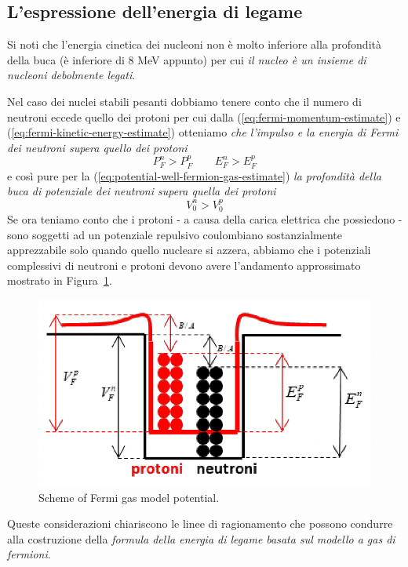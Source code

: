 \subsection{L'espressione dell'energia di legame}\label{subsec:energia-di-legame-fermions-gas}

Si noti che l’energia cinetica dei nucleoni non è molto inferiore alla profondità della buca (è inferiore di 8 MeV appunto) per cui \emph{il nucleo è un insieme di nucleoni debolmente legati}.

Nel caso dei nuclei stabili pesanti dobbiamo tenere conto che il numero di neutroni eccede quello dei protoni per cui dalla (\ref{eq:fermi-momentum-estimate}) e (\ref{eq:fermi-kinetic-energy-estimate}) otteniamo \emph{che l’impulso e la energia di Fermi dei neutroni supera quello dei protoni}
\[
P_{F}^n > P_{F}^p \qquad E_{F}^n > E_{F}^p
\]
e così pure per la (\ref{eq:potential-well-fermion-gas-estimate}) \emph{la profondità della buca di potenziale dei neutroni supera quella dei protoni}
\[
V_{0}^n > V_{0}^p
\]
Se ora teniamo conto che i protoni - a causa della carica elettrica che possiedono - sono soggetti ad un potenziale repulsivo coulombiano sostanzialmente apprezzabile solo
quando quello nucleare si azzera, abbiamo che i potenziali complessivi di
neutroni e protoni devono avere l’andamento approssimato mostrato in Figura~\ref{fig:fermi-gas-model-potential-scheme}.

\begin{figure}
	\centering
	\includegraphics{../figs/fermi-gas-model-potential-scheme}
	\caption{Scheme of Fermi gas model potential.}
	\label{fig:fermi-gas-model-potential-scheme}
\end{figure}
\bigskip

Queste considerazioni chiariscono le linee di ragionamento che possono condurre alla costruzione della \emph{formula della energia di legame basata sul modello a gas di fermioni}.

